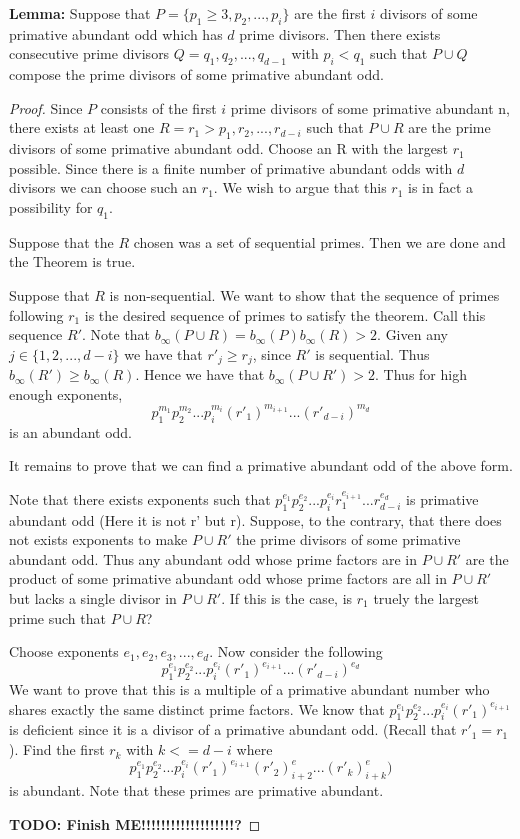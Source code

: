 \documentclass[../paper.tex]{subfiles}
\begin{document}
\textbf{Lemma:} Suppose that $P = \{ p_1 \geq 3, p_2, ..., p_i\}$ are 
the first $i$ divisors of some primative abundant odd which has
$d$ prime divisors. Then there exists consecutive prime divisors
$Q = q_1, q_2, ..., q_{d - 1}$ with $p_i < q_1$ such that 
$P \cup Q$ compose the prime divisors of some primative abundant 
odd.

\begin{proof}
	Since $P$ consists of the first $i$ prime divisors of some 
primative abundant n, there exists at least one
$R = {r_1 > p_1, r_2, ..., r_{d-i}}$ such that $P \cup R$ are the 
prime divisors of some primative abundant odd. Choose an R with the
largest $r_1$ possible. Since there is a finite number of 
primative abundant odds with $d$ divisors we can choose such an
$r_1$. We wish to argue that this $r_1$ is in fact a possibility
for $q_1$.

	Suppose that the $R$ chosen was a set of sequential primes. 
Then we are done and the Theorem is true.

	Suppose that $R$ is non-sequential. We want to show that the 
sequence of primes following $r_1$ is the desired sequence of 
primes to satisfy the theorem. Call this sequence $R'$. Note that
$b_{\infty}(P \cup R) = b_{\infty}(P) b_{\infty}(R) > 2$. Given 
any $j \in \{1, 2, ..., d-i\}$ we have that $r'_j \geq r_j$, since
$R'$ is sequential. Thus $b_{\infty}(R') \geq b_{\infty}(R)$. Hence
we have that $b_{\infty}(P \cup R') > 2$. Thus for high enough 
exponents, 
%
$$p_1^{m_1}  p_2^{m_2} ... p_i^{m_i} (r'_1)^{m_{i+1}} ... (r'_{d-i})^{m_d}$$
%
is an abundant odd.

	It remains to prove that we can find a primative abundant odd 
of the above form.

	Note that there exists exponents such that 
%
$p_1^{e_1}  p_2^{e_2} ... p_i^{e_i} r_1^{e_{i+1}} ... r_{d-i}^{e_d}$
%
is primative abundant odd (Here it is not r' but r). 
Suppose, to the contrary, that there 
does not exists exponents to make $P \cup R'$ the prime divisors 
of some primative abundant odd. Thus any abundant odd whose prime
factors are in $P \cup R'$ are the product of some primative 
abundant odd whose prime factors are all in $P \cup R'$ but lacks
a single divisor in $P \cup R'$. If this is the case, is $r_1$ truely
the largest prime such that $P \cup R$?

Choose exponents $e_1, e_2, e_3, ..., e_d$. Now consider the following
$$p_1^{e_1} p_2^{e_2} ... p_i^{e_i} (r'_1)^{e_{i+1}} ... (r'_{d-i})^{e_d}$$
We want to prove that this is a multiple of a primative abundant 
number who shares exactly the same distinct prime factors. We know 
that $p_1^{e_1} p_2^{e_2} ... p_i^{e_i} (r'_1)^{e_{i+1}}$ is 
deficient since it is a divisor of a primative abundant odd.
(Recall that $r'_1 = r_1$). Find the first $r_k$ with $k <= d - i$
where 
$$p_1^{e_1} p_2^{e_2} ... p_i^{e_i} (r'_1)^{e_{i+1}} (r'_2)^e_{i+2} ... 
(r'_k)^e_{i+k})$$
is abundant. Note that these primes are primative abundant. 

\textbf{TODO: Finish ME!!!!!!!!!!!!!!!!!!!?}

\end{proof}
\end{document}
